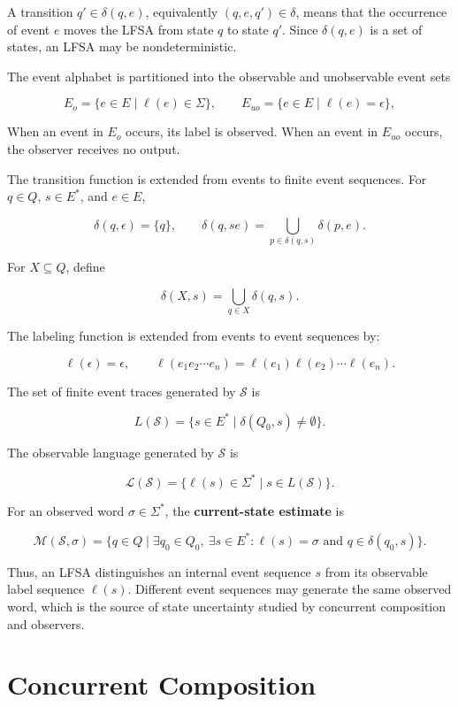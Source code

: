 \documentclass[11pt]{article}
\begin{document}
A transition $q'\in\delta(q,e)$, equivalently $(q,e,q')\in\delta$, means that the occurrence of event $e$ moves the LFSA from state $q$ to state $q'$. Since $\delta(q,e)$ is a set of states, an LFSA may be nondeterministic. 

The event alphabet is partitioned into the observable and unobservable event sets

\[
E_o=\{e\in E\mid\ell(e)\in\Sigma\},
\qquad
E_{uo}=\{e\in E\mid\ell(e)=\epsilon\},
\]

When an event in $E_o$ occurs, its label is observed. When an event in $E_{uo}$ occurs, the observer receives no output.

The transition function is extended from events to finite event sequences. For $q\in Q$, $s\in E^*$, and $e\in E$,

\[
\delta(q,\epsilon)=\{q\},
\qquad
\delta(q,se)=\bigcup_{p\in\delta(q,s)}\delta(p,e).
\]

For $X\subseteq Q$, define

\[
\delta(X,s)=\bigcup_{q\in X}\delta(q,s).
\]

The labeling function is extended from events to event sequences by: 

\[
\ell(\epsilon)=\epsilon,
\qquad
\ell(e_1e_2\cdots e_n)
=\ell(e_1)\ell(e_2)\cdots\ell(e_n).
\]

The set of finite event traces generated by $\mathcal S$ is

\[
L(\mathcal S)
=\{s\in E^*\mid\delta(Q_0,s)\neq\emptyset\}.
\]

The observable language generated by $\mathcal S$ is

\[
\mathcal L(\mathcal S)
=\{\ell(s)\in\Sigma^*\mid s\in L(\mathcal S)\}.
\]

For an observed word $\sigma\in\Sigma^*$, the \textbf{current-state estimate} is

\[
\mathcal M(\mathcal S,\sigma)
=\{q\in Q\mid
\exists q_0\in Q_0,\ 
\exists s\in E^*:
\ell(s)=\sigma
\text{ and }
q\in\delta(q_0,s)\}.
\]

Thus, an LFSA distinguishes an internal event sequence $s$ from its observable label sequence $\ell(s)$. Different event sequences may generate the same observed word, which is the source of state uncertainty studied by concurrent composition and observers.




\section{Concurrent Composition}
\end{document}
